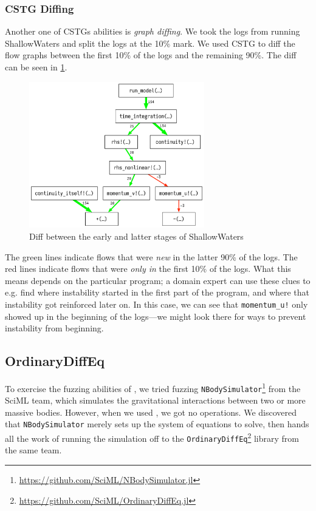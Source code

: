 \documentclass{juliacon}
\begin{document}
\subsubsection{CSTG Diffing}

Another one of CSTGs abilities is \emph{graph diffing}.
We took the \FT{} logs from running ShallowWaters and split the logs at the 10\% mark.
We used CSTG to diff the flow graphs between the first 10\% of the logs and the remaining 90\%.
The diff can be seen in \cref{fig:cstg_diff_demo}.

\begin{figure}[ht]
  \centering
  \includegraphics[width=3in]{./fig/cstg_diff_pretty.png}
  \caption{Diff between the early and latter stages of ShallowWaters}
  \label{fig:cstg_diff_demo}
\end{figure}

The green lines indicate flows that were \emph{new} in the latter 90\% of the logs.
The red lines indicate flows that were \emph{only in} the first 10\% of the logs.
What this means depends on the particular program; a domain expert can use these clues to e.g. find where instability started in the first part of the program, and where that instability got reinforced later on.
In this case, we can see that \texttt{momentum\_u!} only showed up in the beginning of the logs---we might look there for ways to prevent instability from beginning.

\subsection{OrdinaryDiffEq}
\label{s:ode}

To exercise the fuzzing abilities of \FT{}, we tried fuzzing \texttt{NBodySimulator}\footnote{\url{https://github.com/SciML/NBodySimulator.jl}} from the SciML team, which simulates the gravitational interactions between two or more massive bodies.
However, when we used \FT{}, we got no \fp{} operations.
We discovered that \texttt{NBodySimulator} merely sets up the system of equations to solve, then hands all the work of running the simulation off to the \texttt{OrdinaryDiffEq}\footnote{\url{https://github.com/SciML/OrdinaryDiffEq.jl}} library from the same team.
\end{document}
